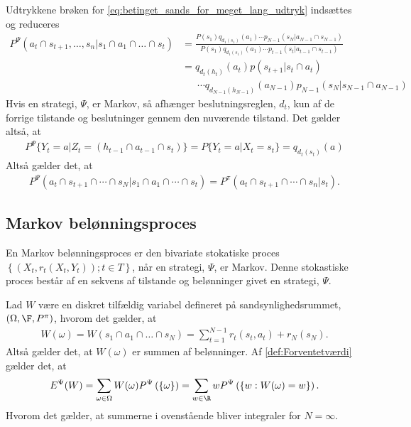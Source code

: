 Udtrykkene brøken for \eqref{eq:betinget_sands_for_meget_lang_udtryk} indsættes og reduceres
\begin{align*}
P^\Psi(a_t \cap s_{t+1}, \dots, s_n | s_1 \cap a_1 \cap \dots \cap s_t) &=\frac{P(s_1)q_{d_1(s_1)}(a_1)
    \cdots p_{N-1}(s_N|a_{N-1} \cap s_{N-1})}{P(s_1)q_{d_1(s_1)}(a_1)
    \cdots p_{t-1}(s_t|a_{t-1} \cap s_{t-1})}\\
    &= q_{d_t(h_t)}(a_t)p(s_{t+1}|s_t \cap a_t)\\
    &\phantom{= \ } \cdots q_{d_{N-1}(h_{N-1})}(a_{N-1})p_{N-1}(s_N|s_{N-1} \cap a_{N-1})
\end{align*}
Hvis en strategi, $\Psi$, er Markov, så afhænger beslutningsreglen, $d_t$, kun af de forrige tilstande og beslutninger gennem den nuværende tilstand. Det gælder altså, at \begin{align*}
    P^\Psi \{Y_t = a | Z_t = (h_{t-1} \cap a_{t-1} \cap s_t) \} = P \{Y_t = a | X_t = s_t\} = q_{d_t(s_t)}(a)
\end{align*}
Altså gælder det, at
\begin{align*}
    P^{\Psi}(a_t \cap s_{t+1} \cap \cdots \cap s_N|s_1 \cap a_1 \cap \cdots \cap s_t)=P^{\pi}(a_t \cap s_{t+1} \cap \cdots \cap s_n|s_t).
\end{align*}

\subsection{Markov belønningsproces}
En Markov belønningsproces er den bivariate stokatiske proces $\left\{\left(X_t, r_t(X_t, Y_t)\right); t \in T\right\}$, når en strategi, $\Psi$, er Markov. Denne stokastiske proces består af en sekvens af tilstande og belønninger givet en strategi, $\Psi$. 

Lad $W$ være en diskret tilfældig variabel defineret på sandsynlighedsrummet, $(\Omega, \F, P^{\pi})$, hvorom det gælder, at
\begin{align*}
    W(\omega)=W(s_1 \cap a_1 \cap \dots \cap s_N) = \sum_{t=1}^{N-1} r_t(s_t,a_t) + r_N(s_N).
\end{align*}
Altså gælder det, at $W(\omega)$ er summen af belønninger. Af \autoref{def:Forventetværdi} gælder det, at
\begin{align*}
    E^\Psi (W) = \sum_{\omega \in \Omega} W(\omega)P^\Psi\left(\{\omega\}\right) = \sum_{w \in \R} w P^\Psi \left(\{w: W(\omega) = w\}\right).
\end{align*}
Hvorom det gælder, at summerne i ovenstående bliver integraler for $N = \infty$.

